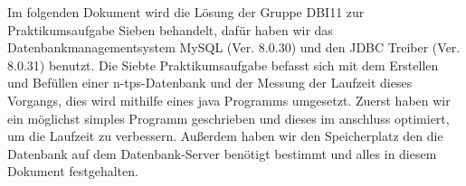 Im folgenden Dokument wird die Lösung der Gruppe DBI11 zur Praktikumsaufgabe Sieben behandelt, dafür haben wir das Datenbankmanagementsystem MySQL (Ver. 8.0.30) und den JDBC Treiber (Ver. 8.0.31) benutzt.
Die Siebte Praktikumsaufgabe befasst sich mit dem Erstellen und Befüllen einer n-tps-Datenbank und der Messung der Laufzeit dieses Vorgangs, dies wird mithilfe eines java Programms umgesetzt.
Zuerst haben wir ein möglichst simples Programm geschrieben und dieses im anschluss optimiert, um die Laufzeit zu verbessern.
Außerdem haben wir den Speicherplatz den die Datenbank auf dem Datenbank-Server benötigt bestimmt und alles in diesem Dokument festgehalten.